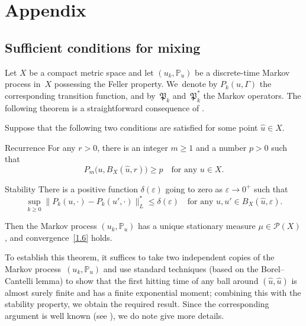 \documentclass[JEP,XML,SOM,Unicode,ThmDefs]{cedram}
\let\mathcal\mathscr
\theoremstyle{plain}
\numberwithin{equation}{section}
\let\e\varepsilon
\newcommand{\IP}{{\mathbb P}}
\newcommand{\PP}{{\mathcal P}}
\newcommand{\PPPP}{{\mathfrak P}}
\begin{document}
\section{Appendix}\label{s5}
\subsection{Sufficient conditions for mixing}\label{s5.1}

Let $X$ be a compact metric space and let $(u_k,\IP_u)$ be a discrete-time Markov process
in~$X$ possessing the Feller property. We~denote by $P_k(u,\Gamma)$ the corresponding transition function, and by~$\PPPP_k$ and~$\PPPP_k^*$ the Markov operators. The following theorem is a straightforward consequence of \cite[Th.\,3.1.3]{KS-book}.

\begin{theorem} \label{t5.1}
Suppose that the following two conditions are satisfied for some point $\hat u\in X$.\vspace*{-.5\baselineskip}
\begin{enonce*}{Recurrence}
For any $r>0$, there is an integer $m\ge1$ and a number $p>0$ such that\vspace*{-5pt}
\begin{equation} \label{5.1}
P_m\bigl(u,B_X(\hat u,r)\bigr)\ge p\quad\text{for any $u\in X$}.
\end{equation}
\end{enonce*}
\begin{enonce*}{Stability}
There is a positive function $\delta(\e)$ going to zero as $\e\to0^+$ such that\vspace*{-3pt}
\begin{equation} \label{5.2}
\sup_{k\ge0}\|P_k(u,\cdot)-P_k(u',\cdot)\|_L^*\le\delta(\e)
\quad\text{for any $u,u'\in B_X(\hat u,\e)$}.
\end{equation}
\end{enonce*}
Then the Markov process $(u_k,\IP_u)$ has a unique stationary measure $\mu\in\PP(X)$,
and convergence~\eqref{1.6} holds.
\end{theorem}

To establish this theorem, it suffices to take two independent copies of the Markov process~$(u_k,\IP_u)$ and use standard techniques (based on the Borel--Cantelli lemma) to show that the first hitting time of any ball around $(\hat u,\hat u)$ is almost surely finite and has a finite exponential moment; combining this with the stability property, we obtain the required result. Since the corresponding argument is well known (\eg see \cite[\S3.3]{KS-book}), we do note give more details.
\end{document}
